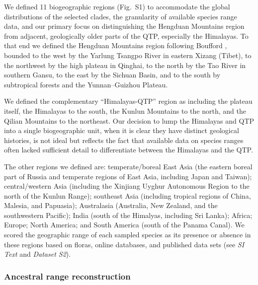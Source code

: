 We defined 11 biogeographic regions (Fig.~S1) to accommodate the
global distributions of the selected clades, the granularity of
available species range data, and our primary focus on distinguishing
the Hengduan Mountains region from adjacent, geologically older parts
of the QTP, especially the Himalayas. To that end we defined the
Hengduan Mountains region following Boufford \citep{Boufford2014},
bounded to the west by the Yarlung Tsangpo River in eastern Xizang
(Tibet), to the northwest by the high plateau in Qinghai, to the north
by the Tao River in southern Gansu, to the east by the Sichuan Basin,
and to the south by subtropical forests and the Yunnan–Guizhou
Plateau.

We defined the complementary ``Himalayas-QTP'' region as including the
plateau itself, the Himalayas to the south, the Kunlun Mountains to
the north, and the Qilian Mountains to the northeast. Our decision to
lump the Himalayas and QTP into a single biogeographic unit, when it
is clear they have distinct geological histories, is not ideal but
reflects the fact that available data on species ranges often lacked
sufficient detail to differentiate between the Himalayas and the
QTP.

The other regions we defined are: temperate/boreal East Asia (the
eastern boreal part of Russia and temperate regions of East Asia,
including Japan and Taiwan); central/western Asia (including the
Xinjiang Uyghur Autonomous Region to the north of the Kunlun Range);
southeast Asia (including tropical regions of China, Malesia, and
Papuasia); Australasia (Australia, New Zealand, and the southwestern
Pacific); India (south of the Himalyas, including Sri Lanka); Africa;
Europe; North America; and South America (south of the Panama
Canal). We scored the geographic range of each sampled species as its
presence or absence in these regions based on floras, online
databases, and published data sets (see \textit{SI Text} and
\textit{Dataset S2}).

\subsubsection*{Ancestral range reconstruction}


